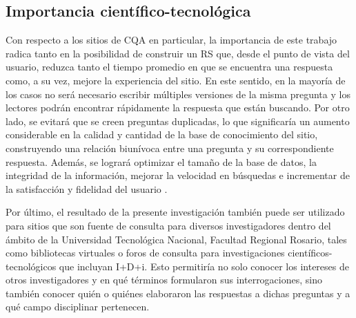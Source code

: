 \subsection{Importancia científico-tecnológica}
Con respecto a los sitios de CQA en particular, la importancia de este trabajo radica tanto en la posibilidad de construir un RS que, desde el punto de vista del usuario, reduzca tanto el tiempo promedio en que se encuentra una respuesta como, a su vez, mejore la experiencia del sitio. En este sentido, en la mayoría de los casos no será necesario escribir múltiples versiones de la misma pregunta y los lectores podrán encontrar rápidamente la respuesta que están buscando. Por otro lado, se evitará que se creen preguntas duplicadas, lo que significaría un aumento considerable en la calidad y cantidad de la base de conocimiento del sitio, construyendo una relación biunívoca entre una pregunta y su correspondiente respuesta. Además, se logrará optimizar el tamaño de la base de datos, la integridad de la información, mejorar la velocidad en búsquedas e incrementar de la satisfacción y fidelidad del usuario \citep{ricci2011introduction}.

\bigskip Por último, el resultado de la presente investigación también puede ser utilizado para sitios que son fuente de consulta para diversos investigadores dentro del ámbito de la Universidad Tecnológica Nacional, Facultad Regional Rosario, tales como bibliotecas virtuales o foros de consulta para investigaciones científicos-tecnológicos que incluyan I+D+i. Esto permitiría no solo conocer los intereses de otros investigadores y en qué términos formularon sus interrogaciones, sino también conocer quién o quiénes elaboraron las respuestas a dichas preguntas y a qué campo disciplinar pertenecen.



